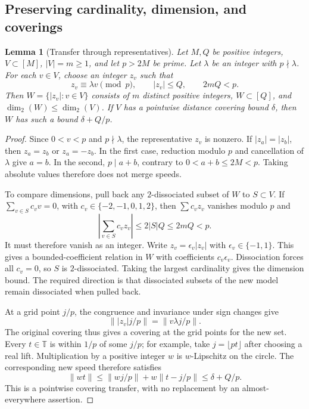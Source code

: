 \documentclass[12pt,leqno]{article}
\numberwithin{equation}{section}
\newtheorem{lemma}[theorem]{Lemma}
\theoremstyle{remark}
\newcommand{\LRtorus}{\mathbb T}
\newcommand{\LRdimension}{\operatorname{dim}_2}
\begin{document}
\subsection{Preserving cardinality, dimension, and coverings}
\begin{lemma}[Transfer through representatives]\label{lem:modeltransfer}
Let $M,Q$ be positive integers, $V\subset[M]$, $|V|=m\ge1$, and let $p>2M$ be prime. Let $\lambda$ be an integer with $p\nmid\lambda$. For each $v\in V$, choose an integer $z_v$ such that
\[
z_v\equiv\lambda v\pmod p,\qquad |z_v|\le Q,\qquad 2mQ<p.
\]
Then $W=\{|z_v|:v\in V\}$ consists of $m$ distinct positive integers, $W\subset[Q]$, and $\LRdimension(W)\le\LRdimension(V)$. If $V$ has a pointwise distance covering bound $\delta$, then $W$ has such a bound $\delta+Q/p$.
\end{lemma}
\begin{proof}
Since $0<v<p$ and $p\nmid\lambda$, the representative $z_v$ is nonzero. If $|z_a|=|z_b|$, then $z_a=z_b$ or $z_a=-z_b$. In the first case, reduction modulo $p$ and cancellation of $\lambda$ give $a=b$. In the second, $p\mid a+b$, contrary to $0<a+b\le2M<p$. Taking absolute values therefore does not merge speeds.

To compare dimensions, pull back any $2$-dissociated subset of $W$ to $S\subset V$. If $\sum_{v\in S}c_vv=0$, with $c_v\in\{-2,-1,0,1,2\}$, then $\sum c_vz_v$ vanishes modulo $p$ and
\[
\left|\sum_{v\in S}c_vz_v\right|\le2|S|Q\le2mQ<p.
\]
It must therefore vanish as an integer. Write $z_v=\epsilon_v|z_v|$ with $\epsilon_v\in\{-1,1\}$. This gives a bounded-coefficient relation in $W$ with coefficients $c_v\epsilon_v$. Dissociation forces all $c_v=0$, so $S$ is $2$-dissociated. Taking the largest cardinality gives the dimension bound. The required direction is that dissociated subsets of the new model remain dissociated when pulled back.

At a grid point $j/p$, the congruence and invariance under sign changes give
\[
\bigl\||z_v|j/p\bigr\|=\|v\lambda j/p\|.
\]
The original covering thus gives a covering at the grid points for the new set. Every $t\in\LRtorus$ is within $1/p$ of some $j/p$; for example, take $j=\lfloor pt\rfloor$ after choosing a real lift. Multiplication by a positive integer $w$ is $w$-Lipschitz on the circle. The corresponding new speed therefore satisfies
\[
\|wt\|\le\|wj/p\|+w\|t-j/p\|\le\delta+Q/p.
\]
This is a pointwise covering transfer, with no replacement by an almost-everywhere assertion.
\end{proof}
\end{document}
